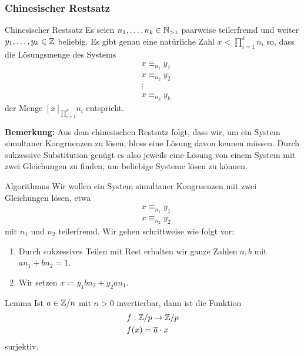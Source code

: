 
\subsubsection{Chinesischer Restsatz}

\begin{definition}{Chinesischer Restsatz}
    Es seien $n_1,\dots,n_k \in \mathbb{N}_{>1}$ paarweise teilerfremd und weiter $y_1,\dots,y_k \in \mathbb{Z}$ beliebig.
    Es gibt genau eine natürliche Zahl $x < \prod_{i=1}^k n_i$ so, dass die Lösungsmenge des Systems
    \begin{align*}
        &x \equiv_{n_1} y_1 \\
        &x \equiv_{n_2} y_2 \\
        &\vdots \\
        &x \equiv_{n_k} y_k
    \end{align*}
    der Menge $[x]_{\prod_{i=1}^k} n_i$ entspricht.
\end{definition}

\textbf{Bemerkung:} Aus dem chinesischen Restsatz folgt, dass wir, um ein System simultaner Kongruenzen zu lösen, bloss eine Lösung davon kennen müssen.
Durch sukzessive Substitution genügt es also jeweils eine Lösung von einem System mit zwei Gleichungen zu finden, um beliebige Systeme lösen zu können.

\begin{subbox}{Algorithmus}
    Wir wollen ein System simultaner Kongruenzen mit zwei Gleichungen lösen, etwa
    \begin{align*}
        &x \equiv_{n_1} y_1 \\
        &x \equiv_{n_2} y_2
    \end{align*}
    mit $n_1$ und $n_2$ teilerfremd.
    Wir gehen schrittweise wie folgt vor:
    \begin{enumerate}
        \item Durch sukzessives Teilen mit Rest erhalten wir ganze Zahlen $a,b$ mit $an_1 + bn_2 = 1$.
        \item Wir setzen $x \coloneqq y_1 bn_2 + y_2 an_1$.
    \end{enumerate}
\end{subbox}

\begin{definition}{Lemma}
    Ist $a \in \mathbb{Z}/n$ mit $n > 0$ invertierbar, dann ist die Funktion
    \begin{align*}
        &f : \mathbb{Z}/p \rightarrow \mathbb{Z}/p \\
        &f(x) = \overline{a} \cdot x
    \end{align*}
    surjektiv.
\end{definition}

